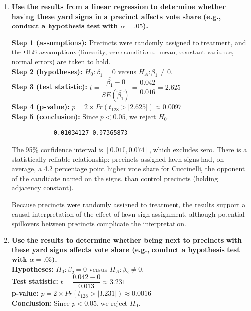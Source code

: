 \documentclass[12pt,letterpaper]{article}
\begin{document}
\vspace{.5cm}
\begin{enumerate}
	\item [(a)] \textbf{Use the results from a linear regression to determine whether having these yard signs in a precinct affects vote share (e.g., conduct a hypothesis test with $\alpha = .05$).}
		
		
		
			\noindent \textbf{Step 1 (assumptions):} Precincts were randomly assigned to treatment, and the OLS assumptions (linearity, zero conditional mean, constant variance, normal errors) are taken to hold.\\
			\textbf{Step 2 (hypotheses):} $H_0: \beta_1 = 0$ versus $H_A: \beta_1 \neq 0$.\\
			\textbf{Step 3 (test statistic):} $t = \dfrac{\hat{\beta_1}-0}{SE(\hat{\beta_1})} = \dfrac{0.042}{0.016} = 2.625$\\
			\textbf{Step 4 (p-value):} $p = 2 \times Pr(t_{128} > |2.625|) \approx 0.0097$\\
			\textbf{Step 5 (conclusion):} Since $p < 0.05$, we reject $H_0$. \\
			
		
		\begin{verbatim}
			0.01034127 0.07365873
		\end{verbatim}
			
			\noindent The 95\% confidence interval is $[0.010, 0.074]$, which excludes zero. There is a statistically reliable relationship: precincts assigned lawn signs had, on average, a 4.2 percentage point higher vote share for Cuccinelli, the opponent of the candidate named on the signs, than control precincts (holding adjacency constant). 
			
			Because precincts were randomly assigned to treatment, the results support a causal interpretation of the effect of lawn-sign assignment, although potential spillovers between precincts complicate the interpretation.
		
	\vspace{1cm}
	\item [(b)]  \textbf{Use the results to determine whether being next to precincts with these yard signs affects vote share (e.g., conduct a hypothesis test with $\alpha = .05$).} \\
		
		
			\noindent \textbf{Hypotheses:} $H_0: \beta_2 = 0$ versus $H_A: \beta_2 \neq 0$.\\
			\textbf{Test statistic:} $t = \dfrac{0.042-0}{0.013} \approx 3.231$\\
			\textbf{p-value:} $p = 2 \times Pr(t_{128} > |3.231|) \approx 0.0016$\\
			\textbf{Conclusion:} Since $p < 0.05$, we reject $H_0$. \\
			

\end{enumerate}
\end{document}
